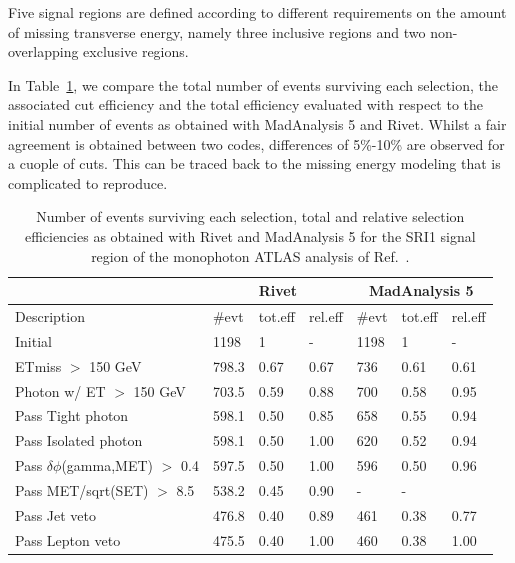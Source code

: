 \documentclass[11pt]{cernrep}
\begin{document}
Five signal regions are defined according to different requirements on the
amount of missing transverse energy, namely three inclusive regions and two
non-overlapping exclusive regions.

In Table~\ref{tab:1704.03848}, we
compare the total number of events surviving each selection, the associated cut
efficiency and the total efficiency evaluated with respect to the initial number
of events as obtained with MadAnalysis 5 and Rivet. Whilst a fair agreement is
obtained between two codes, differences of 5\%-10\% are observed for a cuople of
cuts. This can be traced back to the missing energy modeling that is complicated
to reproduce.

\begin{table}
 \centering
  \begin{tabular}{ | l || l | l | l || l | l | l | }
\hline
                  &  \multicolumn{3}{c||}{\bf Rivet} & \multicolumn{3}{c||}{\bf MadAnalysis 5}    \\ \hline

Description       & \#evt & tot.eff & rel.eff & \#evt & tot.eff & rel.eff    \\ \hline \hline

Initial                    &  	1198	& 1		  & -     & 1198	& 1	 &    -      \\ \hline
ETmiss $>$ 150 GeV           &   	798.3	& 0.67	& 0.67	& 736	& 0.61 &  0.61     \\ \hline
Photon w/ ET $>$ 150 GeV     &   	703.5	& 0.59	& 0.88	& 700	& 0.58 &  0.95     \\ \hline
Pass Tight photon          &   	598.1	& 0.50	& 0.85	& 658	& 0.55 & 	0.94     \\ \hline
Pass Isolated photon       &   	598.1	& 0.50	& 1.00	& 620	& 0.52 & 	0.94     \\ \hline
Pass $\delta\phi$(gamma,MET) $>$ 0.4 &   	597.5	& 0.50	& 1.00	& 596	& 0.50 & 	0.96     \\ \hline
Pass MET/sqrt(SET) $>$ 8.5   &   	538.2	& 0.45	& 0.90	& -	  &  -   &     	     \\ \hline
Pass Jet veto              &   	476.8	& 0.40	& 0.89	& 461	& 0.38 & 	0.77     \\ \hline
Pass Lepton veto           &   	475.5	& 0.40	& 1.00	& 460	& 0.38 & 	1.00     \\ \hline
  \end{tabular}
 \caption{Number of events surviving each selection, total and relative
  selection efficiencies as obtained with Rivet and MadAnalysis 5 for the SRI1
  signal region of the monophoton ATLAS analysis of Ref.~\cite{Aaboud:2017dor}.}
 \label{tab:1704.03848}
\end{table}
\end{document}
